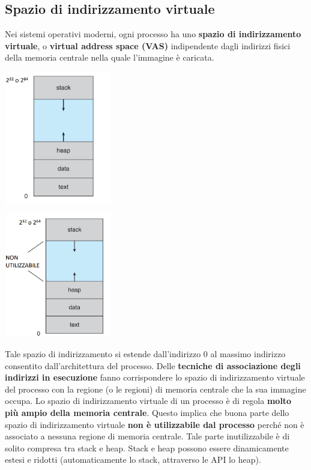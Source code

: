 \documentclass[12pt]{article}
\begin{document}
\subsection{Spazio di indirizzamento virtuale}
Nei sistemi operativi moderni, ogni processo ha uno \textbf{spazio di indirizzamento virtuale}, o \textbf{virtual address space (VAS)} indipendente dagli indirizzi fisici della memoria centrale nella quale l'immagine è caricata.
\begin{center}
    \includegraphics[width = 0.35\textwidth]{Images/20.png}
\end{center}
\begin{center}
    \includegraphics[width = 0.35\textwidth]{Images/21.png}
\end{center}
\noindent
Tale spazio di indirizzamento si estende dall'indirizzo 0 al massimo indirizzo consentito dall'architettura del processo.
Delle \textbf{tecniche di associazione degli indirizzi in esecuzione} fanno corrispondere lo spazio di indirizzamento virtuale del processo
con la regione (o le regioni) di memoria centrale che la sua immagine occupa.
Lo spazio di indirizzamento virtuale di un processo è di regola \textbf{molto più ampio della memoria centrale}.
Questo implica che buona parte dello spazio di indirizzamento virtuale \textbf{non è utilizzabile dal processo} perché non è associato a nessuna regione di memoria
centrale. Tale parte inutilizzabile è di solito compresa tra stack e heap. Stack e heap possono essere dinamicamente estesi e ridotti (automaticamente lo stack, attraverso le API lo heap).
\end{document}
